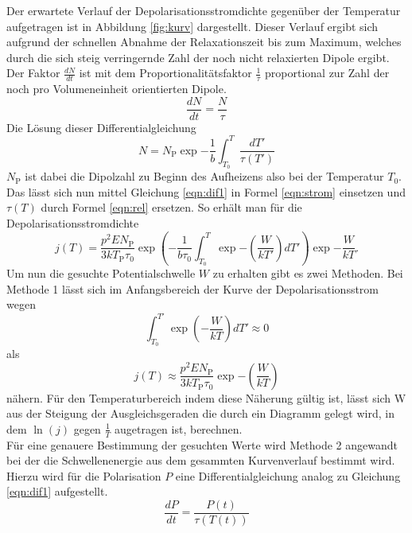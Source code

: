  Der erwartete Verlauf der Depolarisationsstromdichte gegenüber der Temperatur aufgetragen ist in Abbildung \ref{fig:kurv} dargestellt.
Dieser Verlauf ergibt sich aufgrund der schnellen Abnahme der Relaxationszeit bis zum Maximum,
welches durch die sich steig verringernde Zahl der noch nicht relaxierten Dipole ergibt.
Der Faktor $\frac{dN}{dt}$ ist mit dem Proportionalitätsfaktor $\frac{1}{\tau}$ proportional zur Zahl
der noch pro Volumeneinheit orientierten Dipole.
\begin{equation}
\frac{dN}{dt}=\frac{N}{\tau}
\label{eqn:dif1}
\end{equation}
Die Lösung dieser Differentialgleichung
\begin{equation}
N=N_{\text{P}}\exp{-\frac{1}{b}\int_{T_{0}}^{T} \frac{dT'}{\tau(T')}}
\label{eqn:N}
\end{equation}
$N_{\text{P}}$ ist dabei die Dipolzahl zu Beginn des Aufheizens also bei der Temperatur $T_{0}$.
Das lässt sich nun mittel Gleichung \ref{eqn:dif1} in Formel \ref{eqn:strom} einsetzen und $\tau(T)$ durch Formel \ref{eqn:rel} ersetzen.
So erhält man für die Depolarisationsstromdichte
\begin{equation}
j(T)=\frac{p^{2}EN_{\text{P}}}{3kT_{\text{P}}\tau_{0}} \exp{\left(-\frac{1}{b\tau_{0}}\int_{T_{0}}^{T}\exp{-(\frac{W}{kT'})dT'}\right)}\exp{-\frac{W}{kT}}  .
\label{strom2}
\end{equation}
Um nun die gesuchte Potentialschwelle $W$ zu erhalten gibt es zwei Methoden.
Bei Methode 1 lässt sich im Anfangsbereich der Kurve der Depolarisationsstrom wegen
\begin{equation}
\int_{T_{0}}^{T'} \exp{(-\frac{W}{kT})}dT' \approx 0
\end{equation}
als
\begin{equation}
j(T) \approx \frac{p^{2}E N_{\text{P}}}{3k T_{\text{P}}\tau_{0}} \exp{-(\frac{W}{kT})}
\label{eqn:stmet1}
\end{equation}
nähern.
Für den Temperaturbereich indem diese Näherung gültig ist,
lässt sich W aus der Steigung der Ausgleichsgeraden die durch ein Diagramm gelegt wird, in dem
$\ln(j)$ gegen $\frac{1}{T}$ augetragen ist, berechnen.\\
Für eine genauere Bestimmung der gesuchten Werte wird Methode 2 angewandt bei der
die Schwellenenergie aus dem gesammten Kurvenverlauf bestimmt wird.
Hierzu wird für die Polarisation $P$ eine Differentialgleichung analog
zu Gleichung \ref{eqn:dif1} aufgestellt.
\begin{equation}
  \frac{dP}{dt}=\frac{P(t)}{\tau(T(t))}
\end{equation}
